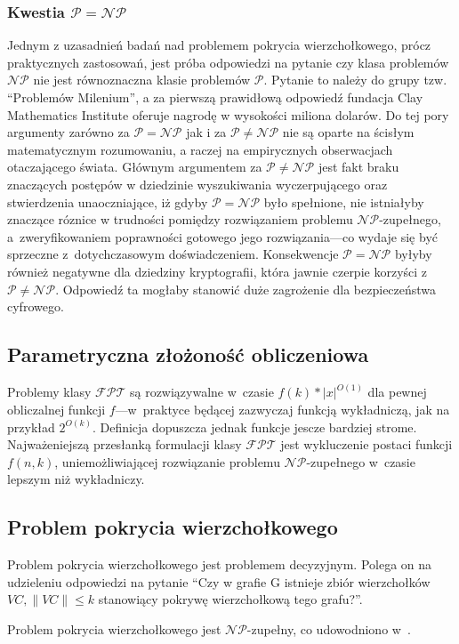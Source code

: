 \subsubsection{Kwestia $\mathcal{P}=\mathcal{NP}$}
\label{sss_problem_p_neq_np}
\par{
  Jednym z uzasadnień badań nad problemem pokrycia wierzchołkowego, prócz
  praktycznych zastosowań, jest próba odpowiedzi na pytanie czy klasa problemów
  $\mathcal{NP}$ nie jest równoznaczna klasie problemów $\mathcal{P}$.
  Pytanie to należy do grupy tzw. ``Problemów Milenium'', a za pierwszą
  prawidłową odpowiedź fundacja Clay Mathematics Institute oferuje nagrodę w
  wysokości miliona dolarów. 
  Do tej pory argumenty zarówno za $\mathcal{P}=\mathcal{NP}$ jak i za
  $\mathcal{P}\neq\mathcal{NP}$ nie są oparte na ścisłym matematycznym
  rozumowaniu, a raczej na empirycznych obserwacjach otaczającego świata.
  Głównym argumentem za $\mathcal{P}\neq\mathcal{NP}$ jest fakt braku znaczących
  postępów w dziedzinie wyszukiwania wyczerpującego oraz stwierdzenia
  unaoczniające, iż gdyby $\mathcal{P}=\mathcal{NP}$ było spełnione, nie 
  istniałyby znaczące róznice w trudności pomiędzy rozwiązaniem 
  problemu $\mathcal{NP}$-zupełnego, a~zweryfikowaniem poprawności gotowego 
  jego rozwiązania---co wydaje się być sprzeczne z~dotychczasowym doświadczeniem.
  Konsekwencje $\mathcal{P}=\mathcal{NP}$ byłyby również negatywne dla dziedziny
  kryptografii, która jawnie czerpie korzyści z $\mathcal{P}\neq\mathcal{NP}$.
  Odpowiedź ta mogłaby stanowić duże zagrożenie dla bezpieczeństwa cyfrowego.
}

\subsection{Parametryczna złożoność obliczeniowa}
\label{sss_parametric_complexity}
\par{
  Problemy klasy $\mathcal{FPT}$ są rozwiązywalne w~czasie $f(k)*|x|^{O(1)}$ dla
  pewnej obliczalnej funkcji $f$---w~praktyce będącej zazwyczaj funkcją 
  wykładniczą, jak na przykład $2^{O(k)}$.
  Definicja dopuszcza jednak funkcje jescze bardziej strome.
  Najważeniejszą przesłanką formulacji klasy $\mathcal{FPT}$ jest wykluczenie
  postaci funkcji $f(n,k)$, uniemożliwiającej rozwiązanie problemu 
  $\mathcal{NP}$-zupełnego w~czasie lepszym niż wykładniczy.
}

\subsection{Problem pokrycia wierzchołkowego}\label{s_vertex_cover_domain}
\par{
  Problem pokrycia wierzchołkowego jest problemem decyzyjnym.
  Polega on na udzieleniu odpowiedzi na pytanie ``Czy w grafie G istnieje zbiór
  wierzchołków $VC, \|VC\| \leq k$ stanowiący pokrywę wierzchołkową tego
  grafu?''.

  Problem pokrycia wierzchołkowego jest $\mathcal{NP}$-zupełny, co udowodniono
  w~\cite{Kar72}.
}

